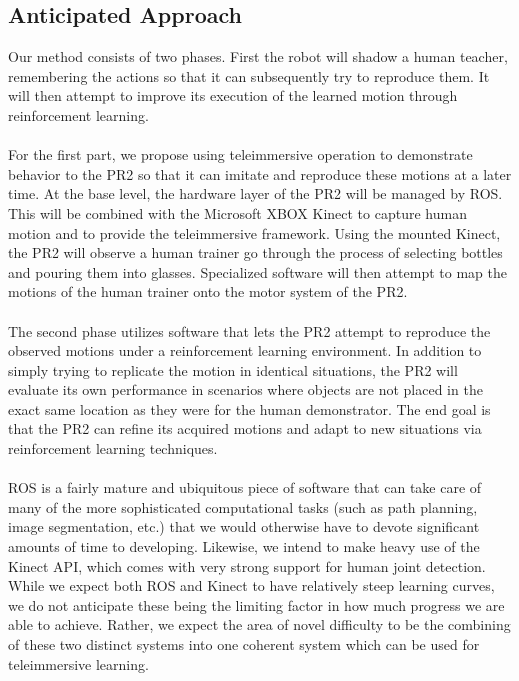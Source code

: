 \documentclass{sig-alternate}
\begin{document}
\subsection{Anticipated Approach}
\label{subsec:approach}
Our method consists of two phases. First the robot will shadow a human teacher,
remembering the actions so that it can subsequently try to reproduce them. 
It will then attempt to improve its execution of the learned motion through 
reinforcement learning.
\\
\\For the first part, we propose using teleimmersive operation to demonstrate
behavior to the PR2 so that it can imitate and reproduce these motions at a
later time. At the base level, the hardware layer of the PR2 will be managed 
by ROS. This will be combined with the Microsoft XBOX Kinect to capture human
motion and to provide the teleimmersive framework.
Using the mounted Kinect, the PR2 will observe a human trainer go
through the process of selecting bottles and pouring them into glasses. 
Specialized software will then attempt to map the motions of the human trainer
onto the motor system of the PR2.
\\
\\The second phase utilizes software that lets the PR2 attempt to reproduce
the observed motions under a reinforcement learning environment. In addition
to simply trying to replicate the motion in identical situations,
the PR2 will evaluate its own performance in scenarios where objects are not 
placed in the exact same location as they were for the human demonstrator.
The end goal is that the PR2 can refine its acquired motions and adapt to new
situations via reinforcement learning techniques. 
\\ 
\\ROS is a fairly mature and ubiquitous piece of software that can take care of
many of the more sophisticated computational tasks (such as path planning, 
image segmentation, etc.) that we would otherwise have to devote significant 
amounts of time to developing.  
Likewise, we intend to make heavy use of the Kinect API, which comes with very
strong support for human joint detection.
While we expect both ROS and Kinect to have relatively steep learning curves,
we do not anticipate these being the limiting factor in how much progress we
are able to achieve. 
Rather, we expect the area of novel difficulty to be the combining of these
two distinct systems into one coherent system which can be used for
teleimmersive learning.
\end{document}
